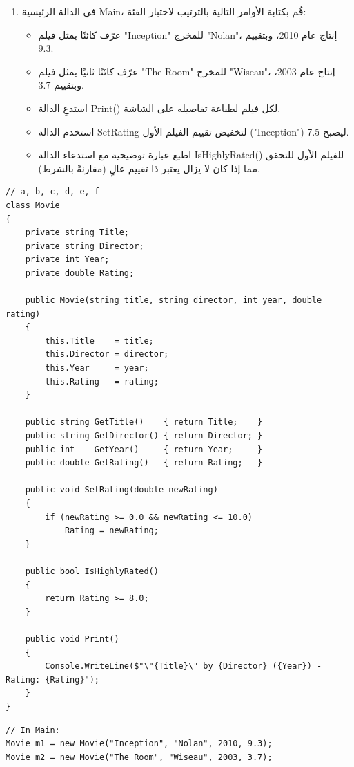\documentclass[14pt]{extarticle}
\begin{document}
\begin{enumerate}[itemsep=2em]
\begin{enumerate}[itemsep=1em]
    \item في الدالة الرئيسية \textenglish{Main}، قُم بكتابة الأوامر التالية بالترتيب لاختبار الفئة:
    \begin{itemize}[itemsep=1pt]
        \item عرّف كائنًا يمثل فيلم \textenglish{"Inception"} للمخرج \textenglish{"Nolan"}، إنتاج عام \textenglish{2010}، وبتقييم \textenglish{9.3}.
        \item عرّف كائنًا ثانيًا يمثل فيلم \textenglish{"The Room"} للمخرج \textenglish{"Wiseau"}، إنتاج عام \textenglish{2003}، وبتقييم \textenglish{3.7}.
        \item استدعِ الدالة \textenglish{Print()} لكل فيلم لطباعة تفاصيله على الشاشة.
        \item استخدم الدالة \textenglish{SetRating} لتخفيض تقييم الفيلم الأول (\textenglish{"Inception"}) ليصبح \textenglish{7.5}.
        \item اطبع عبارة توضيحية مع استدعاء الدالة \textenglish{IsHighlyRated()} للفيلم الأول للتحقق مما إذا كان لا يزال يعتبر ذا تقييم عالٍ (مقارنةً بالشرط).
    \end{itemize}
\end{enumerate}

\ifwithsols
{\small
\begin{boxSolution}
\begin{english}
\begin{verbatim}
// a, b, c, d, e, f
class Movie
{
    private string Title;
    private string Director;
    private int Year;
    private double Rating;

    public Movie(string title, string director, int year, double rating)
    {
        this.Title    = title;
        this.Director = director;
        this.Year     = year;
        this.Rating   = rating;
    }

    public string GetTitle()    { return Title;    }
    public string GetDirector() { return Director; }
    public int    GetYear()     { return Year;     }
    public double GetRating()   { return Rating;   }

    public void SetRating(double newRating)
    {
        if (newRating >= 0.0 && newRating <= 10.0)
            Rating = newRating;
    }

    public bool IsHighlyRated()
    {
        return Rating >= 8.0;
    }

    public void Print()
    {
        Console.WriteLine($"\"{Title}\" by {Director} ({Year}) - Rating: {Rating}");
    }
}
\end{verbatim}
\end{english}
\end{boxSolution}
\begin{boxSolution}
\begin{english}
\begin{verbatim}
// In Main:
Movie m1 = new Movie("Inception", "Nolan", 2010, 9.3);
Movie m2 = new Movie("The Room", "Wiseau", 2003, 3.7);


\end{verbatim}
\end{english}
\end{boxSolution}}
\end{enumerate}
\end{document}
